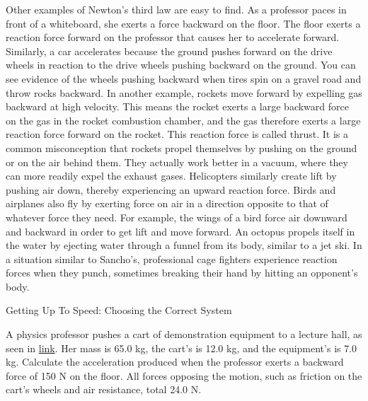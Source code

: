 \documentclass[
]{book}
\begin{document}
Other examples of Newton's third law are easy to find. As a professor
paces in front of a whiteboard, she exerts a force backward on the
floor. The floor exerts a reaction force forward on the professor that
causes her to accelerate forward. Similarly, a car accelerates because
the ground pushes forward on the drive wheels in reaction to the drive
wheels pushing backward on the ground. You can see evidence of the
wheels pushing backward when tires spin on a gravel road and throw rocks
backward. In another example, rockets move forward by expelling gas
backward at high velocity. This means the rocket exerts a large backward
force on the gas in the rocket combustion chamber, and the gas therefore
exerts a large reaction force forward on the rocket. This reaction force
is called \protect\hypertarget{import-auto-id1295864}{}{thrust}. It is a
common misconception that rockets propel themselves by pushing on the
ground or on the air behind them. They actually work better in a vacuum,
where they can more readily expel the exhaust gases. Helicopters
similarly create lift by pushing air down, thereby experiencing an
upward reaction force. Birds and airplanes also fly by exerting force on
air in a direction opposite to that of whatever force they need. For
example, the wings of a bird force air downward and backward in order to
get lift and move forward. An octopus propels itself in the water by
ejecting water through a funnel from its body, similar to a jet ski. In
a situation similar to Sancho's, professional cage fighters experience
reaction forces when they punch, sometimes breaking their hand by
hitting an opponent's body.

\hypertarget{fs-id2355307}{}
Getting Up To Speed: Choosing the Correct System

A physics professor pushes a cart of demonstration equipment to a
lecture hall, as seen in
\protect\hyperlink{import-auto-id2324690}{link}. Her mass is 65.0
kg, the cart's is 12.0 kg, and the equipment's is 7.0 kg. Calculate the
acceleration produced when the professor exerts a backward force of 150
N on the floor. All forces opposing the motion, such as friction on the
cart's wheels and air resistance, total 24.0 N.
\end{document}
